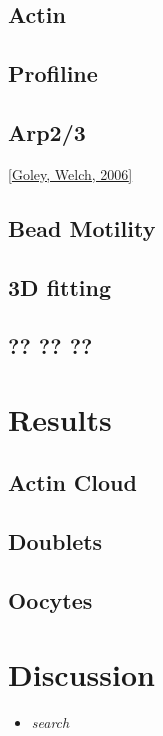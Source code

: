 \documentclass[A4paperpaper,11pt,english]{sphinxmanual}
\begin{document}
\section{Actin}
\label{parts/part2:actin}

\section{Profiline}
\label{parts/part2:profiline}

\section{Arp2/3}
\label{parts/part2:arp2-3}
{\hyperref[bibitem:goley2006]{{[}Goley, Welch,  2006{]}}}


\section{Bead Motility}
\label{parts/part2:bead-motility}

\section{3D fitting}
\label{parts/part2:d-fitting}

\section{?? ?? ??}
\label{parts/part2:id2}

\chapter{Results}
\label{parts/part3::doc}\label{parts/part3:results}

\section{Actin Cloud}
\label{parts/part3:actin-cloud}

\section{Doublets}
\label{parts/part3:doublets}

\section{Oocytes}
\label{parts/part3:oocytes}

\chapter{Discussion}
\label{parts/part4:discussion}\label{parts/part4::doc}\begin{itemize}
\item {} 
\emph{search}

\end{itemize}
\end{document}
